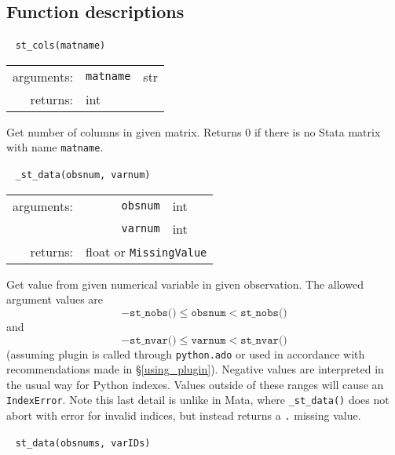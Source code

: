 \documentclass{article}
\begin{document}
\subsection{Function descriptions} \label{func_descript}
			
			
			\ \newline
			\noindent \lstinline$st_cols(matname)$
								
			\vspace{1.5mm}
			\noindent 
			\indent \begin{tabular}{rrl}
					arguments: & \texttt{matname} & str \\
					returns: & \multicolumn{2}{l}{int}
				\end{tabular}
								
			\vspace{1.5mm}
			\noindent Get number of columns in given matrix. Returns 0 if there is no Stata matrix with name \lstinline$matname$. \newline
			
			
			\ \newline
			\noindent \lstinline$_st_data(obsnum, varnum)$
								
			\vspace{1.5mm}
			\noindent 
			\indent \begin{tabular}{rrl}
					arguments: & \texttt{obsnum} & int \\
						& \texttt{varnum} & int \\
					returns: & \multicolumn{2}{l}{float or \lstinline$MissingValue$}
				\end{tabular}
								
			\vspace{1.5mm}
			\noindent Get value from given numerical variable in given observation. The allowed argument values are 
			\[
				-\texttt{st\_nobs()} \leq \texttt{obsnum} < \texttt{st\_nobs()}
			\]
			and
			\[
				-\texttt{st\_nvar()} \leq \texttt{varnum} < \texttt{st\_nvar()}
			\]
			(assuming plugin is called through \lstinline$python.ado$ or used in accordance with recommendations made in \S\ref{using_plugin}). Negative values are interpreted in the usual way for Python indexes. Values outside of these ranges will cause an \lstinline$IndexError$. Note this last detail is unlike in Mata, where \lstinline{_st_data()} does not abort with error for invalid indices, but instead returns a \lstinline{.} missing value.
			\newline
			
			
			\ \newline
			\noindent \lstinline$st_data(obsnums, varIDs)$
								
\end{document}
